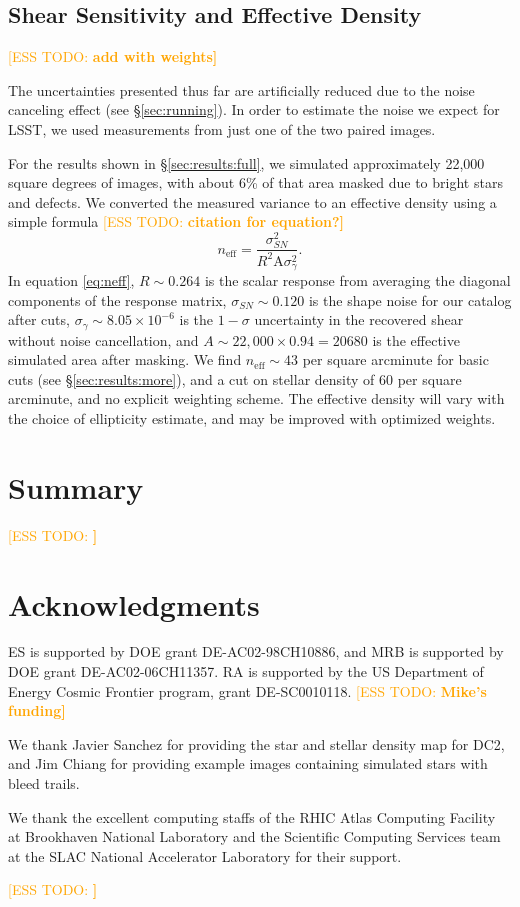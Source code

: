 \documentclass[iop, twocolappendix, appendixfloats, numberedappendix, apj]{hackemulateapj}
\newcommand{\esstodo}[1]{\textcolor{orange}{[ESS TODO: \bf #1]}}
\begin{document}
\subsection{Shear Sensitivity and Effective Density} \label{sec:results:effdens}

\esstodo{add with weights}

The uncertainties presented thus far are artificially reduced due to the noise
canceling effect (see \S \ref{sec:running}).  In order to estimate the noise
we expect for LSST, we used measurements from just one of the two paired images.

For the results shown in \S \ref{sec:results:full}, we simulated approximately
22,000 square degrees of images, with about 6\% of that area masked due to
bright stars and defects.  We converted the measured variance to an
effective density using a simple formula \esstodo{citation for equation?}
\begin{equation} \label{eq:neff}
    n_{\mathrm{eff}} = \frac{\sigma^2_{SN}}{R^2 \mathrm{A} \sigma^2_{\gamma}}.
\end{equation}
In equation \ref{eq:neff}, $R \sim 0.264$ is the scalar response from averaging
the diagonal components of the response matrix, $\sigma_{SN} \sim 0.120$ is the
shape noise for our catalog after cuts, $\sigma_{\gamma} \sim 8.05 \times
10^{-6}$ is the $1-\sigma$ uncertainty in the recovered shear without noise cancellation,
and $A \sim 22,000 \times 0.94 = 20680$ is the effective simulated area after
masking.  We find $n_\mathrm{eff} \sim 43$
per square arcminute for basic cuts (see \S \ref{sec:results:more}), and a cut
on stellar density of 60 per square arcminute, and no explicit weighting
scheme.  The effective density will vary with the choice of ellipticity
estimate, and may be improved with optimized weights.


\section{Summary} \label{sec:summary}

\esstodo{}

\section*{Acknowledgments}

ES is supported by DOE grant DE-AC02-98CH10886, and MRB is supported by DOE
grant DE-AC02-06CH11357. RA is supported by the US Department of Energy Cosmic
Frontier program, grant DE-SC0010118.  \esstodo{Mike's funding}

We thank Javier Sanchez for providing the star and stellar density map for DC2,
and Jim Chiang for providing example images containing simulated stars
with bleed trails.

We thank the excellent computing staffs of the RHIC Atlas Computing Facility at
Brookhaven National Laboratory and the Scientific Computing Services team at
the SLAC National Accelerator Laboratory for their support.

\esstodo{}


%
%
%
%


\end{document}
